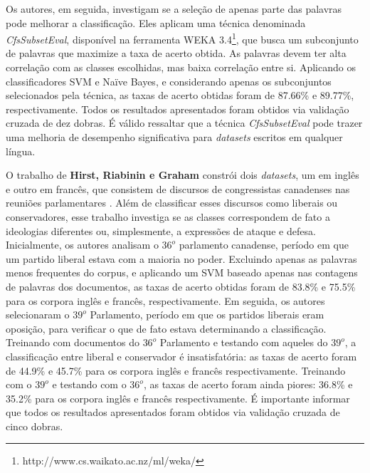 Os autores, em seguida, investigam se a seleção de apenas parte das palavras pode melhorar a classificação. Eles aplicam uma técnica denominada \emph{CfsSubsetEval}, disponível na ferramenta WEKA 3.4\footnote{http://www.cs.waikato.ac.nz/ml/weka/}, que busca um subconjunto de palavras que maximize a taxa de acerto obtida. As palavras devem ter alta correlação com as classes escolhidas, mas baixa correlação entre si. Aplicando os classificadores SVM e Naïve Bayes, e considerando apenas os subconjuntos selecionados pela técnica, as taxas de acerto obtidas foram de 87.66\% e 89.77\%, respectivamente. Todos os resultados apresentados foram obtidos via validação cruzada de dez dobras. É válido ressaltar que a técnica \emph{CfsSubsetEval} pode trazer uma melhoria de desempenho significativa para \emph{datasets} escritos em qualquer língua.

O trabalho de \textbf{Hirst, Riabinin e Graham} constrói dois \emph{datasets}, um em inglês e outro em francês, que consistem de discursos de congressistas canadenses nas reuniões parlamentares \cite{hirst-et-al}. Além de classificar esses discursos como liberais ou conservadores, esse trabalho investiga se as classes correspondem de fato a ideologias diferentes ou, simplesmente, a expressões de ataque e defesa. Inicialmente, os autores analisam o \ensuremath{36^o} parlamento canadense, período em que um partido liberal estava com a maioria no poder. Excluindo apenas as palavras menos frequentes do corpus, e aplicando um SVM baseado apenas nas contagens de palavras dos documentos, as taxas de acerto obtidas foram de 83.8\% e 75.5\% para os corpora inglês e francês, respectivamente. Em seguida, os autores selecionaram o \ensuremath{39^o} Parlamento, período em que os partidos liberais eram oposição, para verificar o que de fato estava determinando a classificação. Treinando com documentos do \ensuremath{36^o} Parlamento e testando com aqueles do \ensuremath{39^o}, a classificação entre liberal e conservador é insatisfatória: as taxas de acerto foram de 44.9\% e 45.7\% para os corpora inglês e francês respectivamente. Treinando com o \ensuremath{39^o} e testando com o \ensuremath{36^o}, as taxas de acerto foram ainda piores: 36.8\% e 35.2\% para os corpora inglês e francês respectivamente. É importante informar que todos os resultados apresentados foram obtidos via validação cruzada de cinco dobras. 

